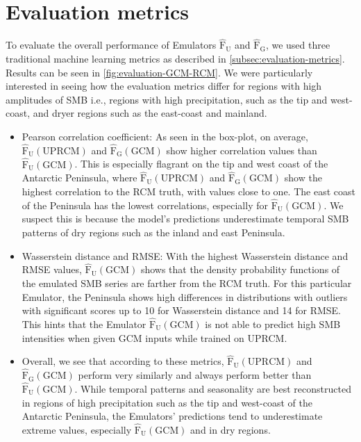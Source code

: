 \documentclass[a4paper,11pt,oneside]{report}
\begin{document}
\section{Evaluation metrics}
To evaluate the overall performance of Emulators $\mathrm{\hat{F}_{U}}$ and $\mathrm{\hat{F}_{G}}$, we used three traditional machine learning metrics as described in \autoref{subsec:evaluation-metrics}. Results can be seen in \autoref{fig:evaluation-GCM-RCM}. We were particularly interested in seeing how the evaluation metrics differ for regions with high amplitudes of SMB i.e., regions with high precipitation, such as the tip and west-coast, and dryer regions such as the east-coast and mainland. 
\begin{itemize}
    \item Pearson correlation coefficient: As seen in the box-plot, on average, $\mathrm{\hat{F}_{U}(UPRCM)}$ and $\mathrm{\hat{F}_{G}(GCM)}$ show higher correlation values than $\mathrm{\hat{F}_{U}(GCM)}$. This is especially flagrant on the tip and west coast of the Antarctic Peninsula, where $\mathrm{\hat{F}_{U}(UPRCM)}$ and $\mathrm{\hat{F}_{G}(GCM)}$ show the highest correlation to the RCM truth, with values close to one. The east coast of the Peninsula has the lowest correlations, especially for $\mathrm{\hat{F}_{U}(GCM)}$. We suspect this is because the model's predictions underestimate temporal SMB patterns of dry regions such as the inland and east Peninsula. 
    \item Wasserstein distance and RMSE: With the highest Wasserstein distance and RMSE values, $\mathrm{\hat{F}_{U}(GCM)}$ shows that the density probability functions of the emulated SMB series are farther from the RCM truth. For this particular Emulator, the Peninsula shows high differences in distributions with outliers with significant scores up to 10 for Wasserstein distance and 14 for RMSE. This hints that the Emulator $\mathrm{\hat{F}_{U}(GCM)}$ is not able to predict high SMB intensities when given GCM inputs while trained on UPRCM.   
    \item Overall, we see that according to these metrics, $\mathrm{\hat{F}_{U}(UPRCM)}$ and $\mathrm{\hat{F}_{G}(GCM)}$ perform very similarly and always perform better than $\mathrm{\hat{F}_{U}(GCM)}$. While temporal patterns and seasonality are best reconstructed in regions of high precipitation such as the tip and west-coast of the Antarctic Peninsula, the Emulators' predictions tend to underestimate extreme values, especially $\mathrm{\hat{F}_{U}(GCM)}$ and in dry regions. 
\end{itemize}
\end{document}
